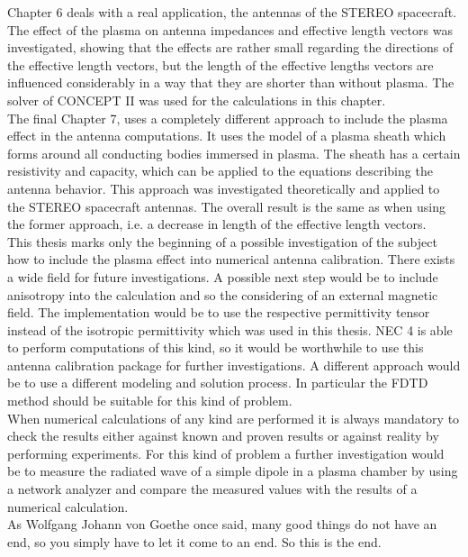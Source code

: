 \documentclass[a4paper,11pt]{thesis}
\begin{document}
Chapter 6 deals with a real application, the antennas of the STEREO spacecraft. The effect of the plasma on antenna impedances and effective
length vectors was investigated, showing that the effects are rather small regarding the directions of the effective length vectors, but the
length of the effective lengths vectors are influenced considerably in a way that they are shorter than without plasma. The solver of CONCEPT II was used for the calculations in this chapter.\\

The final Chapter 7, uses a completely different approach to include the plasma effect in the antenna computations. It uses the model
of a plasma sheath which forms around all conducting bodies immersed in plasma. The sheath has a certain resistivity and capacity, which can
be applied to the equations describing the antenna behavior. This approach was investigated theoretically and applied to the STEREO spacecraft
antennas. The overall result is the same as when using the former approach, i.e. a decrease in length of the effective length vectors.\\

This thesis marks only the beginning of a possible investigation of the subject how to include the plasma effect into numerical antenna
calibration. There exists a wide field for future investigations. A possible next step would be to include anisotropy into the calculation and so the considering of an external magnetic field. The implementation would be to use the respective permittivity tensor instead of the isotropic permittivity which was used in this thesis. NEC 4 is able to perform computations of this kind, so it would be worthwhile to use this antenna calibration package for further investigations. A different approach would be to use a different modeling and solution process. In particular the FDTD method should be suitable for this kind of problem.\\

When numerical calculations of any kind are performed it is always mandatory to check the results either against known and proven results or
against reality by performing experiments. For this kind of problem a further investigation would be to measure the radiated wave of a simple dipole in
a plasma chamber by using a network analyzer and compare the measured values with the results of a numerical calculation.\\

As Wolfgang Johann von Goethe once said, many good things do not have an end, so you simply have to let it come to an end. So this is the end.
\end{document}
